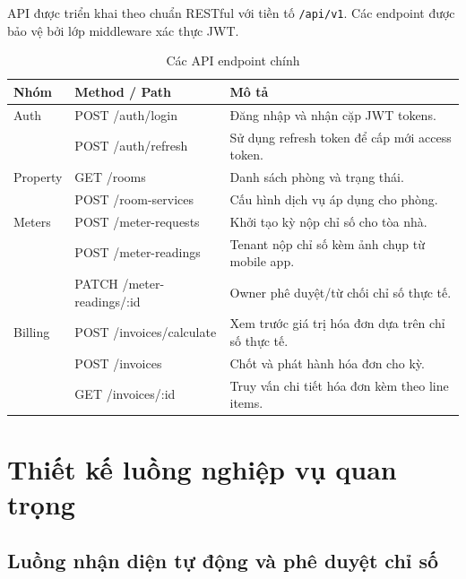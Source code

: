 API được triển khai theo chuẩn RESTful với tiền tố \texttt{/api/v1}. Các endpoint được bảo vệ bởi lớp middleware xác thực JWT.

\begin{table}[htbp]
\centering
\caption{Các API endpoint chính}
\label{tab:api}
\begin{tabularx}{\textwidth}{llX}
\toprule
\textbf{Nhóm} & \textbf{Method / Path} & \textbf{Mô tả} \\
\midrule
Auth & POST /auth/login & Đăng nhập và nhận cặp JWT tokens. \\
 & POST /auth/refresh & Sử dụng refresh token để cấp mới access token. \\
\midrule
Property & GET /rooms & Danh sách phòng và trạng thái. \\
 & POST /room-services & Cấu hình dịch vụ áp dụng cho phòng. \\
\midrule
Meters & POST /meter-requests & Khởi tạo kỳ nộp chỉ số cho tòa nhà. \\
 & POST /meter-readings & Tenant nộp chỉ số kèm ảnh chụp từ mobile app. \\
 & PATCH /meter-readings/:id & Owner phê duyệt/từ chối chỉ số thực tế. \\
\midrule
Billing & POST /invoices/calculate & Xem trước giá trị hóa đơn dựa trên chỉ số thực tế. \\
 & POST /invoices & Chốt và phát hành hóa đơn cho kỳ. \\
 & GET /invoices/:id & Truy vấn chi tiết hóa đơn kèm theo line items. \\
\bottomrule
\end{tabularx}
\end{table}

\section{Thiết kế luồng nghiệp vụ quan trọng}

\subsection{Luồng nhận diện tự động và phê duyệt chỉ số}

